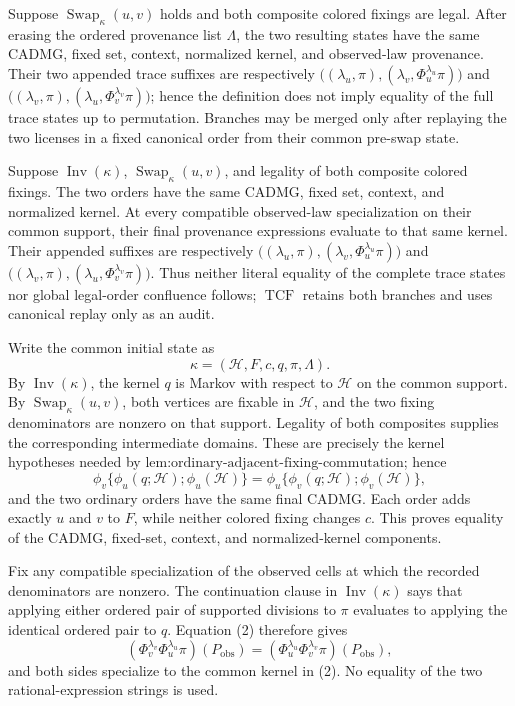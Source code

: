 Suppose \(\operatorname{Swap}_{\kappa}(u,v)\) holds and both composite colored fixings are legal. After erasing the ordered provenance list \(\Lambda\), the two resulting states have the same CADMG, fixed set, context, normalized kernel, and observed-law provenance. Their two appended trace suffixes are respectively \(\bigl((\lambda_u,\pi),(\lambda_v,\Phi_u^{\lambda_u}\pi)\bigr)\) and \(\bigl((\lambda_v,\pi),(\lambda_u,\Phi_v^{\lambda_v}\pi)\bigr)\); hence the definition does not imply equality of the full trace states up to permutation. Branches may be merged only after replaying the two licenses in a fixed canonical order from their common pre-swap state.

Suppose \(\operatorname{Inv}(\kappa)\), \(\operatorname{Swap}_{\kappa}(u,v)\), and legality of both composite colored fixings. The two orders have the same CADMG, fixed set, context, and normalized kernel. At every compatible observed-law specialization on their common support, their final provenance expressions evaluate to that same kernel. Their appended suffixes are respectively \(\bigl((\lambda_u,\pi),(\lambda_v,\Phi_u^{\lambda_u}\pi)\bigr)\) and \(\bigl((\lambda_v,\pi),(\lambda_u,\Phi_v^{\lambda_v}\pi)\bigr)\). Thus neither literal equality of the complete trace states nor global legal-order confluence follows; \(\operatorname{TCF}\) retains both branches and uses canonical replay only as an audit.

Write the common initial state as
\[
\kappa=(\mathcal H,F,c,q,\pi,\Lambda).
\tag{1}
\]
By \(\operatorname{Inv}(\kappa)\), the kernel \(q\) is Markov with respect to \(\mathcal H\) on the common support. By \(\operatorname{Swap}_{\kappa}(u,v)\), both vertices are fixable in \(\mathcal H\), and the two fixing denominators are nonzero on that support. Legality of both composites supplies the corresponding intermediate domains. These are precisely the kernel hypotheses needed by \(\text{lem:ordinary-adjacent-fixing-commutation}\); hence
\[
\phi_v\{\phi_u(q;\mathcal H);\phi_u(\mathcal H)\}
=
\phi_u\{\phi_v(q;\mathcal H);\phi_v(\mathcal H)\},
\tag{2}
\]
and the two ordinary orders have the same final CADMG. Each order adds exactly \(u\) and \(v\) to \(F\), while neither colored fixing changes \(c\). This proves equality of the CADMG, fixed-set, context, and normalized-kernel components.

Fix any compatible specialization of the observed cells at which the recorded denominators are nonzero. The continuation clause in \(\operatorname{Inv}(\kappa)\) says that applying either ordered pair of supported divisions to \(\pi\) evaluates to applying the identical ordered pair to \(q\). Equation (2) therefore gives
\[
\left(\Phi_v^{\lambda_v}\Phi_u^{\lambda_u}\pi\right)(P_{\mathrm{obs}})
=
\left(\Phi_u^{\lambda_u}\Phi_v^{\lambda_v}\pi\right)(P_{\mathrm{obs}}),
\tag{3}
\]
and both sides specialize to the common kernel in (2). No equality of the two rational-expression strings is used.

